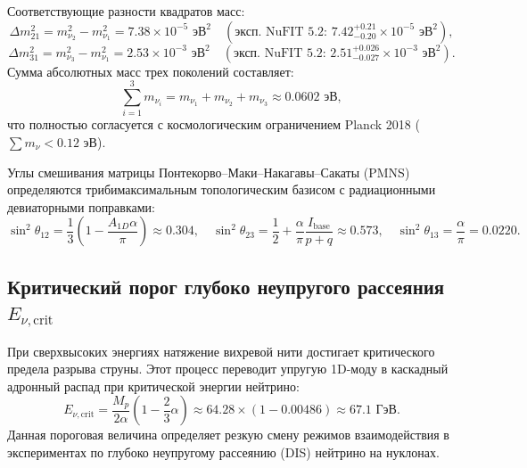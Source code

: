 \documentclass[12pt,a4paper]{article}
\theoremstyle{definition}
\theoremstyle{remark}
\begin{document}
Соответствующие разности квадратов масс:
\begin{equation}
	\Delta m_{21}^2 = m_{\nu_2}^2 - m_{\nu_1}^2 = 7.38 \times 10^{-5} \text{ эВ}^2 \quad (\text{эксп. NuFIT 5.2: } 7.42_{-0.20}^{+0.21} \times 10^{-5} \text{ эВ}^2),
	\label{eq:dm21}
\end{equation}
\begin{equation}
	\Delta m_{31}^2 = m_{\nu_3}^2 - m_{\nu_1}^2 = 2.53 \times 10^{-3} \text{ эВ}^2 \quad (\text{эксп. NuFIT 5.2: } 2.51_{-0.027}^{+0.026} \times 10^{-3} \text{ эВ}^2).
	\label{eq:dm31}
\end{equation}
Сумма абсолютных масс трех поколений составляет:
\begin{equation}
	\sum_{i=1}^3 m_{\nu_i} = m_{\nu_1} + m_{\nu_2} + m_{\nu_3} \approx 0.0602 \text{ эВ},
	\label{eq:neutrino_sum}
\end{equation}
что полностью согласуется с космологическим ограничением Planck 2018 ($\sum m_\nu < 0.12$ эВ).

Углы смешивания матрицы Понтекорво--Маки--Накагавы--Сакаты (PMNS) определяются трибимаксимальным топологическим базисом с радиационными девиаторными поправками:
\begin{equation}
	\sin^2\theta_{12} = \frac{1}{3}\left(1 - \frac{A_{1D}\alpha}{\pi}\right) \approx 0.304, \quad \sin^2\theta_{23} = \frac{1}{2} + \frac{\alpha}{\pi}\frac{I_{\mathrm{base}}}{p+q} \approx 0.573, \quad \sin^2\theta_{13} = \frac{\alpha}{\pi} = 0.0220.
	\label{eq:pmns_angles}
\end{equation}

\subsection{Критический порог глубоко неупругого рассеяния $E_{\nu, \mathrm{crit}}$}
При сверхвысоких энергиях натяжение вихревой нити достигает критического предела разрыва струны. Этот процесс переводит упругую 1D-моду в каскадный адронный распад при критической энергии нейтрино:
\begin{equation}
	E_{\nu, \mathrm{crit}} = \frac{M_p}{2\alpha} \left( 1 - \frac{2}{3}\alpha \right) \approx 64.28 \times \left( 1 - 0.00486 \right) \approx 67.1 \text{ ГэВ}.
	\label{eq:e_nu_crit}
\end{equation}
Данная пороговая величина определяет резкую смену режимов взаимодействия в экспериментах по глубоко неупругому рассеянию (DIS) нейтрино на нуклонах.
\end{document}

